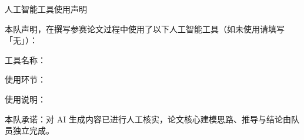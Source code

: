 \clearpage
\thispagestyle{plain}

\begin{center}
  {\heiti{} 人工智能工具使用声明}
\end{center}

\vspace{1em}

\noindent 本队声明，在撰写参赛论文过程中使用了以下人工智能工具（如未使用请填写「无」）：

\vspace{0.6em}

\noindent 工具名称：\underline{}

\vspace{0.5em}

\noindent 使用环节：\underline{}

\vspace{0.5em}

\noindent 使用说明：\underline{\makebox[10cm][c]{[简要说明用途与人工审核方式]}}

\vspace{1.2em}

\noindent 本队承诺：对 AI 生成内容已进行人工核实，论文核心建模思路、推导与结论由队员独立完成。

\vfill
